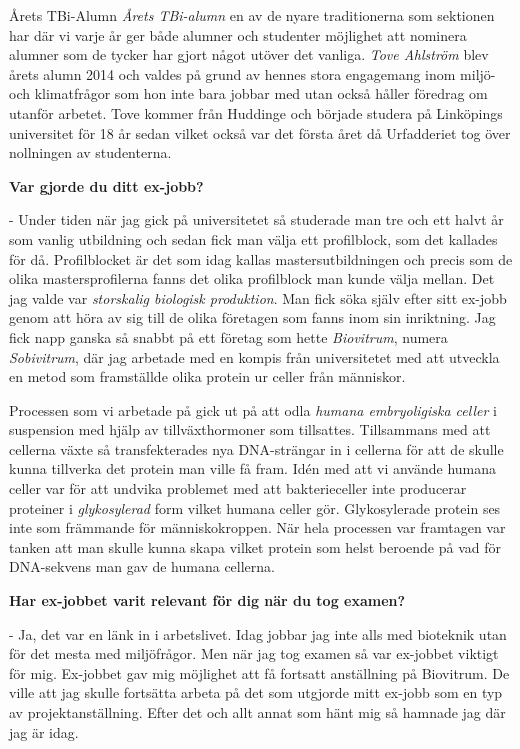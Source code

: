Årets TBi-Alumn
\emph{Årets TBi-alumn} en av de nyare traditionerna som sektionen har där vi varje 
år ger både alumner och studenter möjlighet att nominera alumner som de 
tycker har gjort något utöver det vanliga. \emph{Tove Ahlström} blev årets alumn 
2014 och valdes på grund av hennes stora engagemang inom miljö- och 
klimatfrågor som hon inte bara jobbar med utan också håller föredrag om 
utanför arbetet. Tove kommer från Huddinge och började studera på Linköpings 
universitet för 18 år sedan vilket också var det första året då Urfadderiet 
tog över nollningen av studenterna.
 
\textbf{Var gjorde du ditt ex-jobb?}
 
 - Under tiden när jag gick på universitetet så studerade man tre och ett halvt 
 år som vanlig utbildning och sedan fick man välja ett profilblock, som det 
kallades för då. Profilblocket är det som idag kallas mastersutbildningen och 
precis som de olika mastersprofilerna fanns det olika profilblock man kunde 
välja mellan. Det jag valde var \emph{storskalig biologisk produktion}. Man fick 
söka själv efter sitt ex-jobb genom att höra av sig till de olika företagen 
som fanns inom sin inriktning. Jag fick napp ganska så snabbt på ett företag 
som hette \emph{Biovitrum}, numera \emph{Sobivitrum}, där jag arbetade med en kompis från 
universitetet med att utveckla en metod som framställde olika protein ur 
celler från människor.

Processen som vi arbetade på gick ut på att odla \emph{humana embryoligiska celler} 
i suspension med hjälp av tillväxthormoner som tillsattes. Tillsammans med 
att cellerna växte så transfekterades nya DNA-strängar in i cellerna för att 
de skulle kunna tillverka det protein man ville få fram. Idén med att 
vi använde humana celler var för att undvika problemet med att bakterieceller 
inte producerar proteiner i \emph{glykosylerad} form vilket humana celler gör. 
Glykosylerade protein ses inte som främmande för människokroppen. När hela 
processen var framtagen var tanken att man skulle kunna skapa vilket protein 
som helst beroende på vad för DNA-sekvens man gav de humana cellerna.
 
\textbf{Har ex-jobbet varit relevant för dig när du tog examen?}

 - Ja, det var en länk in i arbetslivet. Idag jobbar jag inte alls med bioteknik 
utan för det mesta med miljöfrågor. Men när jag tog examen så var ex-jobbet 
viktigt för mig. Ex-jobbet gav mig möjlighet att få fortsatt anställning på 
Biovitrum. De ville att jag skulle fortsätta arbeta på det som utgjorde mitt 
ex-jobb som en typ av projektanställning. Efter det och allt annat som hänt 
mig så hamnade jag där jag är idag. 

